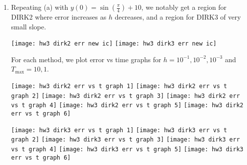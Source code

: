\documentclass{article}
\begin{document}
\begin{enumerate}[label=(\alph*)]
\item Repeating (a) with $y(0)=\sin(\frac\pi4)+10$, we notably get a region for DIRK2 where error increases as $h$ decreases, and a region for DIRK3 of very small slope.

\begin{center}
	\texttt{[image: hw3 dirk2 err new ic]}
	\texttt{[image: hw3 dirk3 err new ic]}
\end{center}

For each method, we plot error vs time graphs for $h=10^{-1},10^{-2},10^{-3}$ and $T_\text{max}=10,1$.

\begin{center}
	\texttt{[image: hw3 dirk2 err vs t graph 1]}
	\texttt{[image: hw3 dirk2 err vs t graph 2]}
	\texttt{[image: hw3 dirk2 err vs t graph 3]}
	\texttt{[image: hw3 dirk2 err vs t graph 4]}
	\texttt{[image: hw3 dirk2 err vs t graph 5]}
	\texttt{[image: hw3 dirk2 err vs t graph 6]}
	
	\texttt{[image: hw3 dirk3 err vs t graph 1]}
	\texttt{[image: hw3 dirk3 err vs t graph 2]}
	\texttt{[image: hw3 dirk3 err vs t graph 3]}
	\texttt{[image: hw3 dirk3 err vs t graph 4]}
	\texttt{[image: hw3 dirk3 err vs t graph 5]}
	\texttt{[image: hw3 dirk3 err vs t graph 6]}
\end{center}

\end{enumerate}
\end{document}
